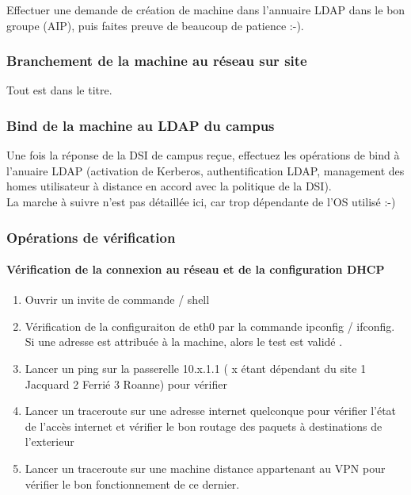 \documentclass[a4paper]{article}
\begin{document}
Effectuer une demande de création de machine dans l'annuaire LDAP dans le bon groupe (AIP), puis faites preuve de beaucoup de patience :-).

\subsubsection{Branchement de la machine au réseau sur site}
Tout est dans le titre.

\subsubsection{Bind de la machine au LDAP du campus}

Une fois la réponse de la DSI de campus reçue, effectuez les opérations de bind à l'anuaire LDAP  (activation de Kerberos, authentification LDAP, management des homes utilisateur à distance en accord avec la politique de la DSI).\\
La marche à suivre n'est pas détaillée ici, car trop dépendante de l'OS utilisé :-)

\subsubsection{Opérations de vérification}

\paragraph{Vérification de la connexion au réseau et de la configuration DHCP}

\begin{enumerate}
\item Ouvrir un invite de commande / shell
\item Vérification de la configuraiton de eth0 par la commande ipconfig / ifconfig. Si une adresse est attribuée à  la machine, alors le test est validé . 
\item Lancer un ping sur la passerelle 10.x.1.1 ( x étant dépendant du site 1 Jacquard 2 Ferrié 3 Roanne) pour vérifier 
\item Lancer un traceroute sur une adresse internet quelconque pour vérifier l'état de l'accès internet et vérifier le bon routage des paquets à destinations de l'exterieur
\item Lancer un traceroute sur une machine distance appartenant au VPN pour vérifier le bon fonctionnement de ce dernier.
\end{enumerate}
\end{document}
